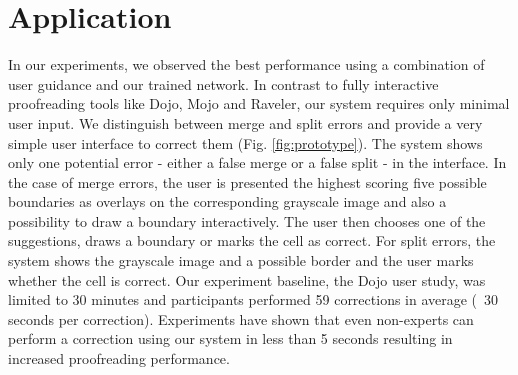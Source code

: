 \section{Application}

In our experiments, we observed the best performance using a combination of user guidance and our trained network. In contrast to fully interactive proofreading tools like Dojo, Mojo and Raveler, our system requires only minimal user input. We distinguish between merge and split errors and provide a very simple user interface to correct them (Fig. \ref{fig:prototype}).
The system shows only one potential error - either a false merge or a false split - in the interface. In the case of merge errors, the user is presented the highest scoring five possible boundaries as overlays on the corresponding grayscale image and also a possibility to draw a boundary interactively. The user then chooses one of the suggestions, draws a boundary or marks the cell as correct.  For split errors, the system shows the grayscale image and a possible border and the user marks whether the cell is correct. Our experiment baseline, the Dojo user study, was limited to 30 minutes and participants performed 59 corrections in average (~30 seconds per correction). Experiments have shown that even non-experts can perform a correction using our system in less than 5 seconds resulting in increased proofreading performance.